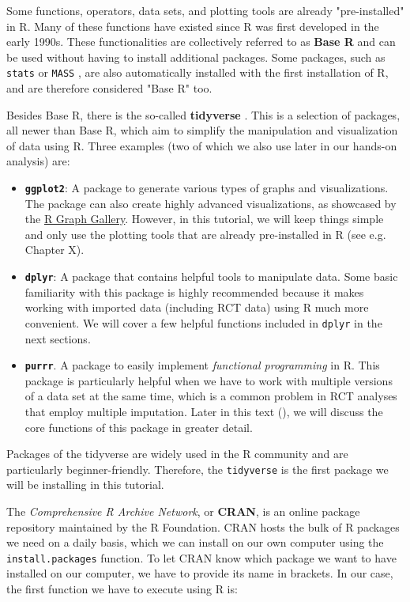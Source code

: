 Some functions, operators, data sets, and plotting tools are already "pre-installed" in \textsf{R}. Many of these functions have existed since \textsf{R} was first developed in the early 1990s. These functionalities are collectively referred to as \textbf{Base \textsf{R}} and can be used without having to install additional packages. Some packages, such as \texttt{stats} or \texttt{MASS} \citep{MASS}, are also automatically installed with the first installation of \textsf{R}, and are therefore considered "Base \textsf{R}" too.

Besides Base \textsf{R}, there is the so-called \textbf{tidyverse} \citep{wickham2019welcome}. This is a selection of packages, all newer than Base \textsf{R}, which aim to simplify the manipulation and visualization of data using \textsf{R}. Three examples (two of which we also use later in our hands-on analysis) are:

\begin{itemize}
    \item \textbf{\texttt{ggplot2}}: A package to generate various types of graphs and visualizations. The package can also create highly advanced visualizations, as showcased by the \href{https://r-graph-gallery.com/}{R Graph Gallery}. However, in this tutorial, we will keep things simple and only use the plotting tools that are already pre-installed in \textsf{R} (see e.g. Chapter X).
    \item \textbf{\texttt{dplyr}}: A package that contains helpful tools to manipulate data. Some basic familiarity with this package is highly recommended because it makes working with imported data (including RCT data) using \textsf{R} much more convenient. We will cover a few helpful functions included in \texttt{dplyr} in the next sections.
    \item \textbf{\texttt{purrr}}. A package to easily implement \emph{functional programming} in \textsf{R}. This package is particularly helpful when we have to work with multiple versions of a data set at the same time, which is a common problem in RCT analyses that employ multiple imputation. Later in this text (), we will discuss the core functions of this package in greater detail. 
\end{itemize}

Packages of the tidyverse are widely used in the \textsf{R} community and are particularly beginner-friendly. Therefore, the \texttt{tidyverse} is the first package we will be installing in this tutorial. 

The \emph{Comprehensive R Archive Network}, or \textbf{CRAN}, is an online package repository maintained by the \textsf{R} Foundation. CRAN hosts the bulk of \textsf{R} packages we need on a daily basis, which we can install on our own computer using the \texttt{install.packages} function. To let CRAN know which package we want to have installed on our computer, we have to provide its name in brackets. In our case, the first function we have to execute using \textsf{R} is:

